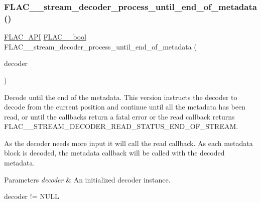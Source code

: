 \subsubsection{\texorpdfstring{F\+L\+A\+C\+\_\+\+\_\+stream\+\_\+decoder\+\_\+process\+\_\+until\+\_\+end\+\_\+of\+\_\+metadata()}{FLAC\_\_stream\_decoder\_process\_until\_end\_of\_metadata()}}
{\footnotesize\ttfamily \hyperlink{group__flac__export_ga56ca07df8a23310707732b1c0007d6f5}{F\+L\+A\+C\+\_\+\+A\+PI} \hyperlink{ordinals_8h_a95103469f1cbd78b8cf250194985b34e}{F\+L\+A\+C\+\_\+\+\_\+bool} F\+L\+A\+C\+\_\+\+\_\+stream\+\_\+decoder\+\_\+process\+\_\+until\+\_\+end\+\_\+of\+\_\+metadata (\begin{DoxyParamCaption}\item[{\hyperlink{struct_f_l_a_c_____stream_decoder}{F\+L\+A\+C\+\_\+\+\_\+\+Stream\+Decoder} $\ast$}]{decoder }\end{DoxyParamCaption})}

Decode until the end of the metadata. This version instructs the decoder to decode from the current position and continue until all the metadata has been read, or until the callbacks return a fatal error or the read callback returns {\ttfamily F\+L\+A\+C\+\_\+\+\_\+\+S\+T\+R\+E\+A\+M\+\_\+\+D\+E\+C\+O\+D\+E\+R\+\_\+\+R\+E\+A\+D\+\_\+\+S\+T\+A\+T\+U\+S\+\_\+\+E\+N\+D\+\_\+\+O\+F\+\_\+\+S\+T\+R\+E\+AM}.

As the decoder needs more input it will call the read callback. As each metadata block is decoded, the metadata callback will be called with the decoded metadata.


\begin{DoxyParams}{Parameters}
{\em decoder} & An initialized decoder instance.  
\begin{DoxyCode}
decoder != NULL 
\end{DoxyCode}
 \\
\hline
\end{DoxyParams}

